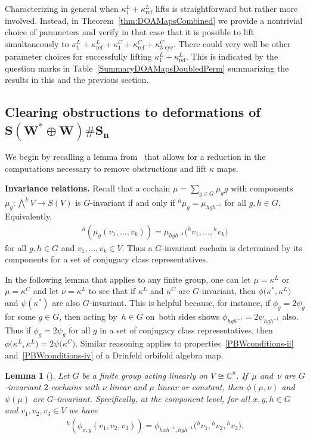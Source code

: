 \documentclass[pdftex]{sigma}
\numberwithin{equation}{section}
\newtheorem{Lemma}[Theorem]{Lemma}
\newcommand{\actby}[1]{{}^{#1}}
\DeclareMathOperator{\refl}{ref}
\DeclareMathOperator{\tri}{3-cyc}
\begin{document}
Characterizing in general when $\kappa^L_1+\kappa^L_{\refl}$ lifts is
straightforward but rather more involved. Instead, in
Theorem~\ref{thm:DOAMapsCombined} we provide a nontrivial choice of parameters
and verify in that case that it is possible to lift simultaneously to
$\kappa^L_1+\kappa^L_{\refl}+\kappa^C_1+\kappa^C_{\refl}+\kappa^C_{\tri}$.
There could very well be other parameter choices for successfully lifting $\kappa_1^L+\kappa^L_{\refl}$. This is indicated by the question marks in Table~\ref{SummaryDOAMapsDoubledPerm} summarizing the results in this
and the previous section.

\subsection[Clearing obstructions to deformations of S(W* + W) Sn]
{Clearing obstructions to deformations of $\boldsymbol{S(W^* \oplus W)\# S_n}$}\label{ObstructionDetails}

We begin by recalling a lemma from~\cite{FGK} that allows
for a reduction in the computations necessary to remove obstructions and lift $\kappa$ maps.

\medskip\noindent
{\bf Invariance relations.}
Recall that a cochain $\mu=\!\sum_{g\in G}\mu_gg$ with components $\mu_g\colon \bigwedge^k V\!\to S(V)$ is $G$-invariant if and only if $\actby{h}\mu_g=\mu_{hgh^{-1}}$ for all $g,h\in G$.
Equivalently,
\begin{gather*}
\actby{h}(\mu_g(v_1,\ldots,v_k))=\mu_{hgh^{-1}}\big(\actby{h}v_1,\ldots,\actby{h}v_k\big)
\end{gather*}
for all $g,h\in G$ and $v_1,\ldots,v_k\in V$. Thus a $G$-invariant cochain is
determined by its components for a set of conjugacy class representatives.

In the following lemma that applies to any finite group, one can let $\mu=\kappa^L$ or $\mu=\kappa^C$ and let $\nu=\kappa^L$ to see that if $\kappa^L$ and $\kappa^C$ are $G$-invariant,
then $\phi\big(\kappa^{*},\kappa^L\big)$ and $\psi(\kappa^{*})$ are also $G$-invariant. This is helpful because, for instance, if $\phi_g=2\psi_g$ for some $g\in G$, then acting by~$h\in G$ on~both sides shows $\phi_{hgh^{-1}}=2\psi_{hgh^{-1}}$ also. Thus if $\phi_g=2\psi_g$ for all $g$ in a set of conjugacy class representatives, then $\phi\big(\kappa^L,\kappa^L\big)=2\psi\big(\kappa^C\big)$. Similar reasoning applies to properties~\eqref{PBWconditions-ii} and~\eqref{PBWconditions-iv} of a Drinfeld orbifold algebra map.

\begin{Lemma}[{\rm \cite[Lemma 5.1]{FGK}}]	\label{le:orbitphixyphig}
	Let $G$ be a finite group acting linearly on $V\cong\mathbb{C}^n$. If~$\mu$ and~$\nu$ are $G$-invariant $2$-cochains with $\nu$ linear and $\mu$ linear or constant,
	then $\phi(\mu,\nu)$ and $\psi(\mu)$ are $G$-invariant. Specifically, at
	the component level, for all $x,y,h\in G$ and $v_1,v_2,v_3\in V$ we have
	\begin{gather*}
	\actby{h}(\phi_{x,y}(v_1,v_2,v_3))=\phi_{hxh^{-1},hyh^{-1}}\big(\actby{h}v_1,\actby{h}v_2,\actby{h}v_3\big).
	\end{gather*}
\end{Lemma}
\end{document}
